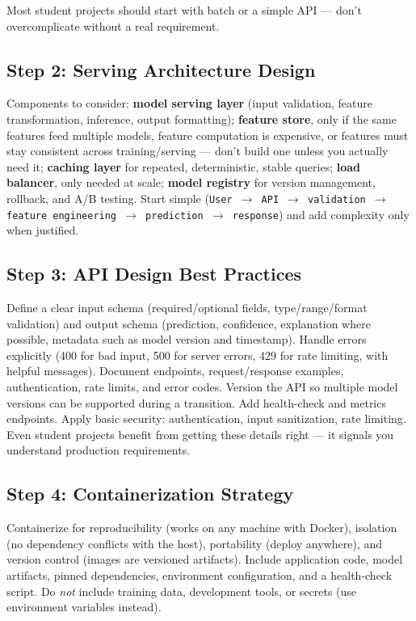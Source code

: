 Most student projects should start with batch or a simple API --- don't overcomplicate without a real requirement.

\subsection{Step 2: Serving Architecture Design}

Components to consider: \textbf{model serving layer} (input validation, feature transformation, inference, output
formatting); \textbf{feature store}, only if the same features feed multiple models, feature computation is
expensive, or features must stay consistent across training/serving --- don't build one unless you actually need
it; \textbf{caching layer} for repeated, deterministic, stable queries; \textbf{load balancer}, only needed at
scale; \textbf{model registry} for version management, rollback, and A/B testing. Start simple (\texttt{User
$\rightarrow$ API $\rightarrow$ validation $\rightarrow$ feature engineering $\rightarrow$ prediction
$\rightarrow$ response}) and add complexity only when justified.

\subsection{Step 3: API Design Best Practices}

Define a clear input schema (required/optional fields, type/range/format validation) and output schema
(prediction, confidence, explanation where possible, metadata such as model version and timestamp). Handle errors
explicitly (400 for bad input, 500 for server errors, 429 for rate limiting, with helpful messages). Document
endpoints, request/response examples, authentication, rate limits, and error codes. Version the API so multiple
model versions can be supported during a transition. Add health-check and metrics endpoints. Apply basic security:
authentication, input sanitization, rate limiting. Even student projects benefit from getting these details right
--- it signals you understand production requirements.

\subsection{Step 4: Containerization Strategy}

Containerize for reproducibility (works on any machine with Docker), isolation (no dependency conflicts with the
host), portability (deploy anywhere), and version control (images are versioned artifacts). Include application
code, model artifacts, pinned dependencies, environment configuration, and a health-check script. Do \emph{not}
include training data, development tools, or secrets (use environment variables instead).

